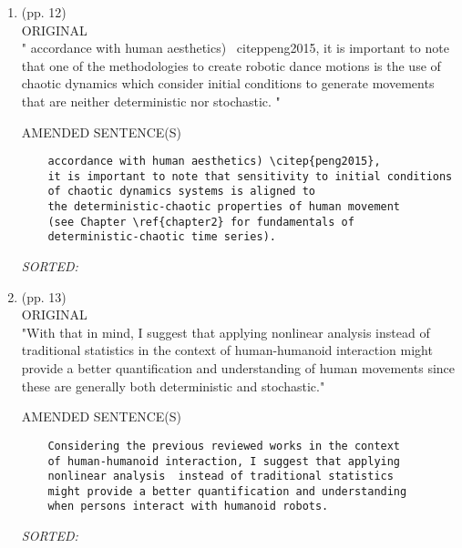 \documentclass[12pt]{article}
\begin{document}
\begin{enumerate}
\item  (pp. 12)   \\

ORIGINAL \\
	"
	accordance with human aesthetics) \ citep{peng2015}, it is important to note 
	that one of the methodologies to create robotic dance motions is the use of 
	chaotic dynamics
	which consider initial conditions to generate movements 
	that are neither deterministic nor stochastic.
	"
 
	AMENDED SENTENCE(S) \\
	\begin{verbatim}
	accordance with human aesthetics) \citep{peng2015}, 
	it is important to note that sensitivity to initial conditions 
	of chaotic dynamics systems is aligned to
	the deterministic-chaotic properties of human movement
	(see Chapter \ref{chapter2} for fundamentals of 
	deterministic-chaotic time series).
	\end{verbatim}
	\textit{
	SORTED:  
	}
	\\














\item  (pp. 13)   \\

ORIGINAL \\
"With that in mind, I suggest that applying nonlinear analysis 
instead of traditional statistics in the context of human-humanoid 
interaction might provide a better quantification and understanding
of human movements since these are generally both deterministic and stochastic."

	AMENDED SENTENCE(S) \\
	\begin{verbatim}
	Considering the previous reviewed works in the context 
	of human-humanoid interaction, I suggest that applying 
	nonlinear analysis  instead of traditional statistics 
	might provide a better quantification and understanding
	when persons interact with humanoid robots.
	\end{verbatim}
	\textit{
	SORTED:  
	}
	\\




\end{enumerate}
\end{document}

